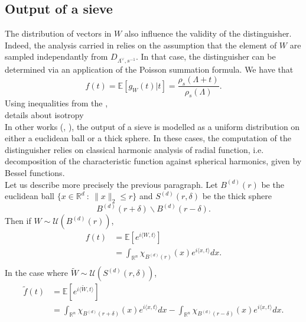 \documentclass{article}
\begin{document}
\subsection{Output of a sieve}

The distribution of vectors in $W$ also influence the validity of the distinguisher. Indeed, the analysis carried in \cite{pouly2023provable} relies on the assumption that the element of $W$ are sampled independantly from $D_{\Lambda^\vee ,s^{-1}}$. In that case, the distinguisher can be determined via an application of the Poisson summation formula. We have that 
\[f(t) = \mathbb E[g_W(t)|t ] = \frac{\rho_s(\Lambda + t)}{\rho_s(\Lambda)}.\] 
Using inequalities from the ,\\

details about isotropy \\

In other works (\cite{carrier2024reduction}, \cite{ducas2023accurate}), the output of a sieve is modelled as a uniform distribution on either a euclidean ball or a thick sphere. In these cases, the computation of the distinguisher relies on classical harmonic analysis of radial function, i.e. decomposition of the characteristic function against spherical harmonics, given by Bessel functions.\\

Let us describe more precisely the previous paragraph. Let $B^{(d)}(r)$ be the euclidean ball $\{x\in\mathbb R^d \ : \  \|x\|_2\leq r\}$ and $S^{(d)}(r,\delta)$ be the thick sphere 
\[ B^{(d)}(r+\delta) \backslash B^{(d)}(r-\delta).\] 
Then if $W\sim\mathcal U(B^{(d)}(r))$,
\[\begin{split}
f(t) & = \mathbb E[e^{i\langle W, t\rangle}] \\
	& = \int_{\mathbb R^n} \chi_{B^{(d)}(r)}(x) e^{i\langle x, t\rangle}dx . \\
\end{split}\]
In the case where $\tilde W\sim\mathcal U(S^{(d)}(r,\delta))$, 
\[\begin{split}
\tilde f(t)  & = \mathbb E[e^{i\langle \tilde W, t\rangle}]\\
	& =  \int_{\mathbb R^n} \chi_{B^{(d)}(r+\delta)}(x) e^{i\langle x, t\rangle}dx - \int_{\mathbb R^n} \chi_{B^{(d)}(r-\delta)}(x) e^{i\langle x, t\rangle}dx. \\
\end{split}\]

    




\end{document}
